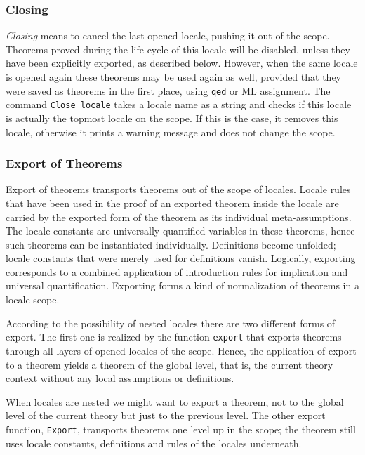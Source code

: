 \subsubsection{Closing}

\emph{Closing} means to cancel the last opened locale, pushing it out of the
scope.  Theorems proved during the life cycle of this locale will be disabled,
unless they have been explicitly exported, as described below.  However, when
the same locale is opened again these theorems may be used again as well,
provided that they were saved as theorems in the first place, using
\texttt{qed} or ML assignment.  The command \texttt{Close\_locale} takes a
locale name as a string and checks if this locale is actually the topmost
locale on the scope.  If this is the case, it removes this locale, otherwise
it prints a warning message and does not change the scope.

\subsubsection{Export of Theorems}
\label{sec:locale-export}

Export of theorems transports theorems out of the scope of locales.  Locale
rules that have been used in the proof of an exported theorem inside the
locale are carried by the exported form of the theorem as its individual
meta-assumptions.  The locale constants are universally quantified variables
in these theorems, hence such theorems can be instantiated individually.
Definitions become unfolded; locale constants that were merely used for
definitions vanish.  Logically, exporting corresponds to a combined
application of introduction rules for implication and universal
quantification.  Exporting forms a kind of normalization of theorems in a
locale scope.

According to the possibility of nested locales there are two different forms
of export.  The first one is realized by the function \texttt{export} that
exports theorems through all layers of opened locales of the scope.  Hence,
the application of export to a theorem yields a theorem of the global level,
that is, the current theory context without any local assumptions or
definitions.

When locales are nested we might want to export a theorem, not to the global
level of the current theory but just to the previous level.  The other export
function, \texttt{Export}, transports theorems one level up in the scope; the
theorem still uses locale constants, definitions and rules of the locales
underneath.


